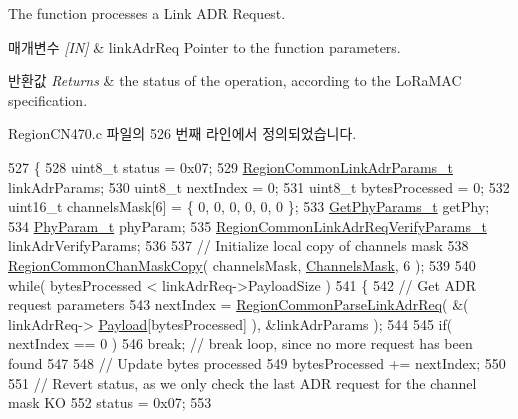 The function processes a Link A\+DR Request. 


\begin{DoxyParams}{매개변수}
{\em \mbox{[}\+I\+N\mbox{]}} & link\+Adr\+Req Pointer to the function parameters.\\
\hline
\end{DoxyParams}

\begin{DoxyRetVals}{반환값}
{\em Returns} & the status of the operation, according to the Lo\+Ra\+M\+AC specification. \\
\hline
\end{DoxyRetVals}


Region\+C\+N470.\+c 파일의 526 번째 라인에서 정의되었습니다.


\begin{DoxyCode}
527 \{
528     uint8\_t status = 0x07;
529     \mbox{\hyperlink{structs_region_common_link_adr_params}{RegionCommonLinkAdrParams\_t}} linkAdrParams;
530     uint8\_t nextIndex = 0;
531     uint8\_t bytesProcessed = 0;
532     uint16\_t channelsMask[6] = \{ 0, 0, 0, 0, 0, 0 \};
533     \mbox{\hyperlink{structs_get_phy_params}{GetPhyParams\_t}} getPhy;
534     \mbox{\hyperlink{unionu_phy_param}{PhyParam\_t}} phyParam;
535     \mbox{\hyperlink{structs_region_common_link_adr_req_verify_params}{RegionCommonLinkAdrReqVerifyParams\_t}} linkAdrVerifyParams;
536 
537     \textcolor{comment}{// Initialize local copy of channels mask}
538     \mbox{\hyperlink{group___r_e_g_i_o_n_c_o_m_m_o_n_ga95f5199d490113269fae7f2e0569e9a0}{RegionCommonChanMaskCopy}}( channelsMask, \mbox{\hyperlink{_region_c_n470_8c_a2188957b5ca6af8092154d7ccbfa5757}{ChannelsMask}}, 6 );
539 
540     \textcolor{keywordflow}{while}( bytesProcessed < linkAdrReq->PayloadSize )
541     \{
542         \textcolor{comment}{// Get ADR request parameters}
543         nextIndex = \mbox{\hyperlink{group___r_e_g_i_o_n_c_o_m_m_o_n_ga8403c78482dbb901014dba48b75d78e8}{RegionCommonParseLinkAdrReq}}( &( linkAdrReq->
      \mbox{\hyperlink{structs_link_adr_req_params_a3dfbfe76c8f3bd25765750487b815147}{Payload}}[bytesProcessed] ), &linkAdrParams );
544 
545         \textcolor{keywordflow}{if}( nextIndex == 0 )
546             \textcolor{keywordflow}{break}; \textcolor{comment}{// break loop, since no more request has been found}
547 
548         \textcolor{comment}{// Update bytes processed}
549         bytesProcessed += nextIndex;
550 
551         \textcolor{comment}{// Revert status, as we only check the last ADR request for the channel mask KO}
552         status = 0x07;
553 

\end{DoxyCode}
